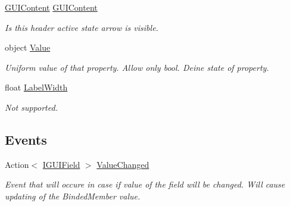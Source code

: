 \begin{DoxyCompactItemize}
\mbox{\hyperlink{class_wpf_handler_1_1_u_i_1_1_g_u_i_content}{G\+U\+I\+Content}} \mbox{\hyperlink{class_wpf_handler_1_1_u_i_1_1_controls_1_1_header_a0039e7d4594591d0d9ca1bf99a1ee497}{G\+U\+I\+Content}}
\begin{DoxyCompactList}\small\item\em Is this header active state arrow is visible. \end{DoxyCompactList}\item 
object \mbox{\hyperlink{class_wpf_handler_1_1_u_i_1_1_controls_1_1_header_a905e42505bb758f31a2178730e41aa19}{Value}}
\begin{DoxyCompactList}\small\item\em Uniform value of that property. Allow only bool. Deine state of  property. \end{DoxyCompactList}\item 
float \mbox{\hyperlink{class_wpf_handler_1_1_u_i_1_1_controls_1_1_header_a09034cb3d506198643c0d13b4b10cfdb}{Label\+Width}}
\begin{DoxyCompactList}\small\item\em Not supported. \end{DoxyCompactList}\end{DoxyCompactItemize}
\subsection*{Events}
\begin{DoxyCompactItemize}
\item 
Action$<$ \mbox{\hyperlink{interface_wpf_handler_1_1_u_i_1_1_auto_layout_1_1_i_g_u_i_field}{I\+G\+U\+I\+Field}} $>$ \mbox{\hyperlink{class_wpf_handler_1_1_u_i_1_1_controls_1_1_header_a0934846d1b0bafdabb4997d47fb01b6c}{Value\+Changed}}
\begin{DoxyCompactList}\small\item\em Event that will occure in case if value of the field will be changed. Will cause updating of the Binded\+Member value. \end{DoxyCompactList}\end{DoxyCompactItemize}
